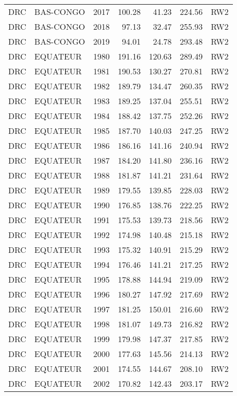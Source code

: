 \begin{longtable}{lllrrrl}
  DRC & BAS-CONGO & 2017 & 100.28 & 41.23 & 224.56 & RW2 \\ 
  DRC & BAS-CONGO & 2018 & 97.13 & 32.47 & 255.93 & RW2 \\ 
  DRC & BAS-CONGO & 2019 & 94.01 & 24.78 & 293.48 & RW2 \\ 
  DRC & EQUATEUR & 1980 & 191.16 & 120.63 & 289.49 & RW2 \\ 
  DRC & EQUATEUR & 1981 & 190.53 & 130.27 & 270.81 & RW2 \\ 
  DRC & EQUATEUR & 1982 & 189.79 & 134.47 & 260.35 & RW2 \\ 
  DRC & EQUATEUR & 1983 & 189.25 & 137.04 & 255.51 & RW2 \\ 
  DRC & EQUATEUR & 1984 & 188.42 & 137.75 & 252.26 & RW2 \\ 
  DRC & EQUATEUR & 1985 & 187.70 & 140.03 & 247.25 & RW2 \\ 
  DRC & EQUATEUR & 1986 & 186.16 & 141.16 & 240.94 & RW2 \\ 
  DRC & EQUATEUR & 1987 & 184.20 & 141.80 & 236.16 & RW2 \\ 
  DRC & EQUATEUR & 1988 & 181.87 & 141.21 & 231.64 & RW2 \\ 
  DRC & EQUATEUR & 1989 & 179.55 & 139.85 & 228.03 & RW2 \\ 
  DRC & EQUATEUR & 1990 & 176.85 & 138.76 & 222.25 & RW2 \\ 
  DRC & EQUATEUR & 1991 & 175.53 & 139.73 & 218.56 & RW2 \\ 
  DRC & EQUATEUR & 1992 & 174.98 & 140.48 & 215.18 & RW2 \\ 
  DRC & EQUATEUR & 1993 & 175.32 & 140.91 & 215.29 & RW2 \\ 
  DRC & EQUATEUR & 1994 & 176.46 & 141.21 & 217.25 & RW2 \\ 
  DRC & EQUATEUR & 1995 & 178.88 & 144.94 & 219.09 & RW2 \\ 
  DRC & EQUATEUR & 1996 & 180.27 & 147.92 & 217.69 & RW2 \\ 
  DRC & EQUATEUR & 1997 & 181.25 & 150.01 & 216.60 & RW2 \\ 
  DRC & EQUATEUR & 1998 & 181.07 & 149.73 & 216.82 & RW2 \\ 
  DRC & EQUATEUR & 1999 & 179.98 & 147.37 & 217.85 & RW2 \\ 
  DRC & EQUATEUR & 2000 & 177.63 & 145.56 & 214.13 & RW2 \\ 
  DRC & EQUATEUR & 2001 & 174.55 & 144.67 & 208.10 & RW2 \\ 
  DRC & EQUATEUR & 2002 & 170.82 & 142.43 & 203.17 & RW2 \\ 

\end{longtable}

